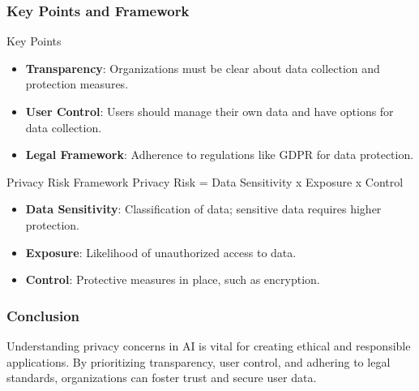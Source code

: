 \documentclass[aspectratio=169]{beamer}
\begin{document}
\begin{frame}[fragile]
    \frametitle{Key Points and Framework}
    \begin{block}{Key Points}
        \begin{itemize}
            \item \textbf{Transparency}: Organizations must be clear about data collection and protection measures.
            \item \textbf{User Control}: Users should manage their own data and have options for data collection.
            \item \textbf{Legal Framework}: Adherence to regulations like GDPR for data protection.
        \end{itemize}
    \end{block}

    \begin{block}{Privacy Risk Framework}
        Privacy Risk = Data Sensitivity x Exposure x Control
        \begin{itemize}
            \item \textbf{Data Sensitivity}: Classification of data; sensitive data requires higher protection.
            \item \textbf{Exposure}: Likelihood of unauthorized access to data.
            \item \textbf{Control}: Protective measures in place, such as encryption.
        \end{itemize}
    \end{block}
\end{frame}

\begin{frame}[fragile]
    \frametitle{Conclusion}
    Understanding privacy concerns in AI is vital for creating ethical and responsible applications. 
    By prioritizing transparency, user control, and adhering to legal standards, organizations can foster trust and secure user data.
\end{frame}
\end{document}
